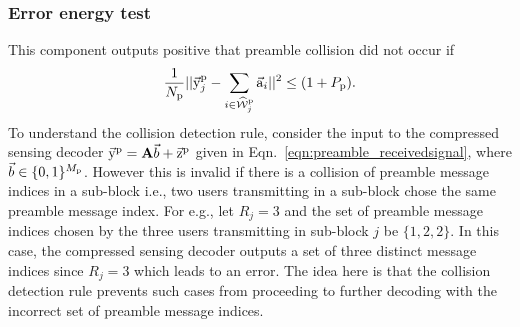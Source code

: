%
%

\subsubsection{Error energy test}
\label{sec:collision_detector}
This component outputs positive that preamble collision did not occur if
\[
\frac{1}{N_{\mathrm{p}}}||\vec{\mathrm{y}}_j^{\mathrm{p}}-\sum_{i\in\widehat{\mathcal{W}}_j^{\mathrm{p}}}\vec{\mathrm{a}}_i||^2 \leq (1+P_{\mathrm{p}}).
\]
To understand the collision detection rule, consider the input to the compressed sensing decoder $\vec{\mathrm{y}}^{\mathrm{p}}= \mathbf{A}\vec{b}+\vec{\mathrm{z}}^{\mathrm{p}}$ given in Eqn.~\eqref{eqn:preamble_receivedsignal}, where $\vec{b}\in\{0,1\}^{M_{\mathrm{p}}}$. However this is invalid if there is a collision of preamble message indices in a sub-block i.e., two users transmitting in a sub-block chose the same preamble message index. For e.g., let $R_j=3$ and the set of preamble message indices chosen by the three users transmitting in sub-block $j$ be $\{1,2,2\}$. In this case, the compressed sensing decoder outputs a set of three distinct message indices since $R_j=3$ which leads to an error. The idea here is that the collision detection rule prevents such cases from proceeding to further decoding with the incorrect set of preamble message indices. 

